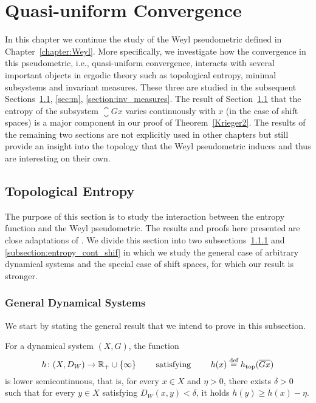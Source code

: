\chapter{Quasi-uniform Convergence}\label{chapter:q-u_convergence}

In this chapter we continue the study of the Weyl pseudometric defined in Chapter~\ref{chapter:Weyl}. 
%
More specifically, we investigate how the convergence in this pseudometric, i.e., quasi-uniform convergence, interacts with several important objects in ergodic theory such as topological entropy, minimal subsystems and invariant measures. 
%
These three are studied in the subsequent Sections~\ref{section:entropy_q-u_cont}, \ref{sec:m},  \ref{section:inv_measures}.
%
The result of Section~\ref{section:entropy_q-u_cont} that the entropy of the subsystem $\closure{Gx}$ varies continuously with $x$ (in the case of shift spaces) is a major component in our proof of Theorem~\ref{Krieger2}.
%
The results of the remaining two sections are not explicitly used in other chapters but still provide an insight into the topology that the Weyl pseudometric induces and thus are interesting on their own.


\section{Topological Entropy}\label{section:entropy_q-u_cont}
The purpose of this section is to study the interaction between the entropy function and the Weyl pseudometric.
%
The results and proofs here presented are close adaptations of \cite[Section 5]{DI88}.
%
We divide this section into two subsections~\ref{subsection:entropy_cont_general} and \ref{subsection:entropy_cont_shif} in which we study the general case of arbitrary dynamical systems and the special case of shift spaces, for which our result is stronger.

\subsection{General Dynamical Systems}\label{subsection:entropy_cont_general}
We start by stating the general result that we intend to prove in this subsection.

\begin{thm}\label{thm:entropy_semicont}
For a dynamical system $(X,G)$, the function
\[
h\colon (X,D_W) \to \mathbb R_+\cup\{\infty\} ~~~~~~ \text{ satisfying } ~~~~~~ h(x) \stackrel{\textup{def}}{=} h_\mathrm{top}(\overline{Gx})
\]
is lower semicontinuous, that is, for every $x\in X$ and $\eta >0$, there exists $\delta >0$ such that for every $y\in X$ satisfying $D_W(x,y)<\delta$, it holds $h(y)\geq h(x)-\eta$.
\end{thm}

